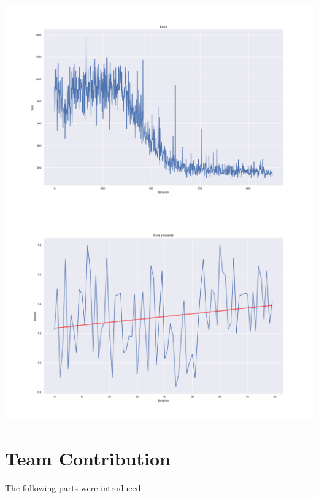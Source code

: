 \documentclass{article}
\begin{document}
\includegraphics[scale=0.2]{plots/landscape_loss.png}
\includegraphics[scale=0.2]{plots/landscape_rewards.png}

\section{Team Contribution}

The following parts were introduced:
\end{document}
